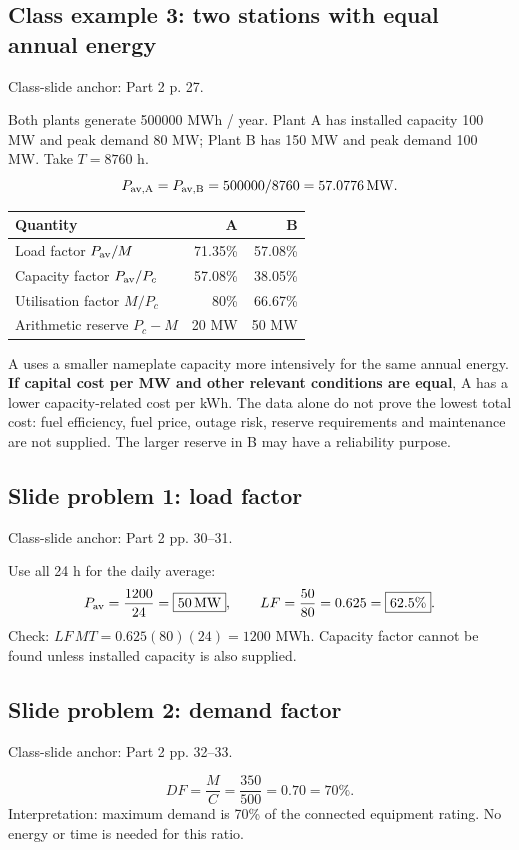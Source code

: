 \documentclass[11pt,a4paper]{article}
\newenvironment{Worked}[1]{\begin{tcolorbox}[breakable=false,colback=white,colframe=teal,colbacktitle=pale,coltitle=ink,title={#1}]}{\end{tcolorbox}}
\newcommand{\slides}[1]{{\small\color{muted}\textsf{Class-slide anchor: #1.}}\par}
\begin{document}
\subsection{Class example 3: two stations with equal annual energy}
\slides{Part 2 p. 27}
Both plants generate 500000 MWh / year. Plant A has installed capacity 100 MW and peak demand 80 MW; Plant B has 150 MW and peak demand 100 MW. Take $T=8760$ h.
\[
P_{\rm av,A}=P_{\rm av,B}=500000/8760=57.0776\,\mathrm{MW}.
\]
\begin{center}\small
\begin{tabular}{lrr}\toprule\textbf{Quantity} & \textbf{A} & \textbf{B}\\\midrule
Load factor $P_{\rm av}/M$ &71.35\%&57.08\%\\
Capacity factor $P_{\rm av}/P_c$ &57.08\%&38.05\%\\
Utilisation factor $M / P_c$ &80\%&66.67\%\\
Arithmetic reserve $P_c-M$ &20 MW&50 MW\\\bottomrule
\end{tabular}\end{center}
A uses a smaller nameplate capacity more intensively for the same annual energy. \textbf{If capital cost per MW and other relevant conditions are equal}, A has a lower capacity-related cost per kWh. The data alone do not prove the lowest total cost: fuel efficiency, fuel price, outage risk, reserve requirements and maintenance are not supplied. The larger reserve in B may have a reliability purpose.

\subsection{Slide problem 1: load factor}
\slides{Part 2 pp. 30--31}
\begin{Worked}{Given: $M=80$ MW, $E=1200$ MWh / day}
Use all 24 h for the daily average:
\[
P_{\rm av}=\frac{1200}{24}=\boxed{50\,\mathrm{MW}},\qquad
LF=\frac{50}{80}=0.625=\boxed{62.5\%}.
\]
Check: $LF\,MT=0.625(80)(24)=1200$ MWh. Capacity factor cannot be found unless installed capacity is also supplied.
\end{Worked}

\subsection{Slide problem 2: demand factor}
\slides{Part 2 pp. 32--33}
\begin{Worked}{Given: $C=500$ kW, $M=350$ kW}
\[
DF=\frac{M}{C}=\frac{350}{500}=0.70=\boxed{70\%}.
\]
Interpretation: maximum demand is 70\% of the connected equipment rating. No energy or time is needed for this ratio.
\end{Worked}
\end{document}
